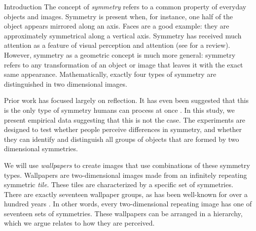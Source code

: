 \begin{block}{Introduction}
The concept of \emph{symmetry} refers to a common property of everyday objects and images. Symmetry is present when, for instance, one half of the object appears mirrored along an axis. Faces are a good example: they are approximately symmetrical along a vertical axis. Symmetry has received much attention as a feature of visual perception and attention (see \citep{review} for a review). However, symmetry as a geometric concept is much more general: symmetry refers to any transformation of an object or image that leaves it with the exact same appearance. Mathematically, exactly four types of symmetry are distinguished in two dimensional images.

Prior work has focused largely on reflection. It has even been suggested that this is the only type of symmetry humans can process at once \citep{bio}. In this study, we present empirical data suggesting that this is not the case. The experiments are designed to test whether people perceive differences in symmetry, and whether they can identify and distinguish all groups of objects that are formed by two dimensional symmetries. 

We will use \emph{wallpapers} to create images that use combinations of these symmetry types. Wallpapers are two-dimensional images made from an infinitely repeating symmetric \textit{tile}. These tiles are characterized by a specific set of symmetries. There are exactly seventeen wallpaper groups, as has been well-known for over a hundred years \citep{wallpaper-proof}. In other words, every two-dimensional repeating image has one of seventeen sets of symmetries. These wallpapers can be arranged in a hierarchy, which we argue relates to how they are perceived.
\end{block}